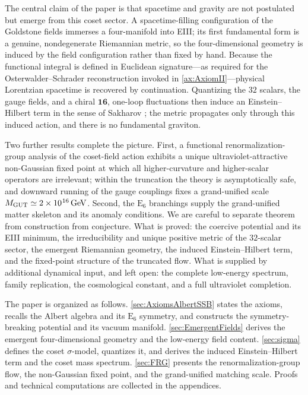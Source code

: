 \documentclass[pdflatex,sn-mathphys-num]{sn-jnl}
\theoremstyle{thmstyleone}
\theoremstyle{thmstyletwo}%
\theoremstyle{thmstylethree}%
\newcommand{\E}[1]{\mathrm{E_{#1}}}
\newcommand{\ESix}{\E{6}}
\newcommand{\sm}{\hspace{.065em}}
\newcommand{\smexp}[1]{^{\sm #1}}
\begin{document}
The central claim of the paper is that spacetime and gravity are not postulated
but emerge from this coset sector. A spacetime-filling configuration of the
Goldstone fields immerses a four-manifold into EIII; its first fundamental form
is a genuine, nondegenerate Riemannian metric, so the four-dimensional geometry
is induced by the field configuration rather than fixed by hand. Because the
functional integral is defined in Euclidean signature---as required for the
Osterwalder--Schrader reconstruction invoked in
\autoref{ax:AxiomII}---physical Lorentzian spacetime is recovered by
continuation. Quantizing the $32$ scalars, the gauge fields, and a chiral
$\mathbf{16}$, one-loop fluctuations then induce an Einstein--Hilbert term in
the sense of Sakharov \cite{SakharovInducedGravity,AdlerInducedGravity}; the metric propagates only through
this induced action, and there is no fundamental graviton.

Two further results complete the picture. First, a functional
renormalization-group analysis of the coset-field action exhibits a unique
ultraviolet-attractive non-Gaussian fixed point at which all higher-curvature
and higher-scalar operators are irrelevant; within the truncation the theory is
asymptotically safe, and downward running of the gauge couplings fixes a
grand-unified scale $M_{\mathrm{GUT}}\simeq2\times10\smexp{16}\,\mathrm{GeV}$.
Second, the $\ESix$ branchings supply the grand-unified matter skeleton and its
anomaly conditions. We are careful to separate theorem from construction from
conjecture. What is proved: the coercive potential and its EIII minimum, the
irreducibility and unique positive metric of the $32$-scalar sector, the
emergent Riemannian geometry, the induced Einstein--Hilbert term, and the
fixed-point structure of the truncated flow. What is supplied by additional
dynamical input, and left open: the complete low-energy spectrum, family
replication, the cosmological constant, and a full ultraviolet completion.

The paper is organized as follows. \autoref{sec:AxiomsAlbertSSB} states the
axioms, recalls the Albert algebra and its $\ESix$ symmetry, and constructs the
symmetry-breaking potential and its vacuum manifold.
\autoref{sec:EmergentFields} derives the emergent four-dimensional geometry and
the low-energy field content. \autoref{sec:sigma} defines the coset
$\sigma$-model, quantizes it, and derives the induced Einstein--Hilbert term and
the coset mass spectrum. \autoref{sec:FRG} presents the renormalization-group
flow, the non-Gaussian fixed point, and the grand-unified matching scale.
Proofs and technical computations are collected in the appendices.
\end{document}
